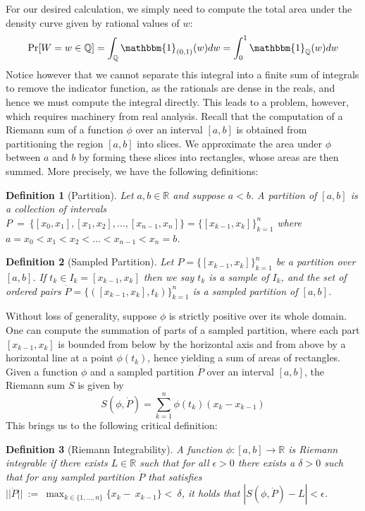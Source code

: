 \documentclass[10pt, oneside]{article}
\newcommand{\R}{\mathbb{R}}
\newcommand{\Q}{\mathbb{Q}}
\newtheorem{defn}{Definition}
\begin{document}
For our desired calculation, we simply need to compute the total area under the density curve given by rational values of $w$:
$$\Pr[W=w\in\Q]=\int_{\Q}\mathbbm{1}_{(0,1)}(w)dw=\int_{0}^{1}\mathbbm{1}_{\Q}(w)dw$$
Notice however that we cannot separate this integral into a finite sum of integrals to remove the indicator function, as the rationals are dense in the reals, and hence we must compute the integral directly.
This leads to a problem, however, which requires machinery from real analysis.
Recall that the computation of a Riemann sum of a function $\phi$ over an interval $[a,b]$ is obtained from partitioning the region $[a,b]$ into slices.
We approximate the area under $\phi$ between $a$ and $b$ by forming these slices into rectangles, whose areas are then summed.
More precisely, we have the following definitions:
\begin{defn}[Partition]
\label{defn:partition}
Let $a,b\in \R$ and suppose $a<b$. A partition of $[a,b]$ is a collection of intervals $P~=~\{[x_0,x_1],[x_1,x_2],\ldots,[x_{n-1},x_n]\}=\{[x_{k-1},x_{k}]\}_{k=1}^n$ where $a=x_0<x_1<x_2<\ldots<x_{n-1}<x_n=b$.
\end{defn}
\begin{defn}[Sampled Partition]
\label{defn:samplepartition}
Let $P=\{[x_{k-1},x_{k}]\}_{k=1}^n$ be a partition over $[a,b]$. If $t_k \in I_k=[x_{k-1},x_k]$ then we say $t_k$ is a sample of $I_k$, and the set of ordered pairs $\dot{P}=\{([x_{k-1},x_{k}],t_k)\}_{k=1}^n$ is a sampled partition of $[a,b]$.
\end{defn}
Without loss of generality, suppose $\phi$ is strictly positive over its whole domain.
One can compute the summation of parts of a sampled partition, where each part $[x_{k-1},x_k]$ is bounded from below by the horizontal axis and from above by a horizontal line at a point $\phi(t_k)$, hence yielding a sum of areas of rectangles.
Given a function $\phi$ and a sampled partition $\dot{P}$ over an interval $[a,b]$, the Riemann sum $S$ is given by 
$$S(\phi,\dot{P})=\sum_{k=1}^n\phi(t_k)(x_k-x_{k-1})$$
This brings us to the following critical definition:
\begin{defn}[Riemann Integrability]
\label{defn:riemann}
A function $\phi:[a,b]\to \R$ is Riemann integrable if there exists $L\in \R$ such that for all $\epsilon>0$ there exists a $\delta >0$ such that for any sampled partition $\dot{P}$ that satisfies $||\dot{P}||~:=~\max_{k\in\{1,\ldots,n\}}\{x_{k}-~x_{k-1}\}<~\delta$, it holds that $|S(\phi,\dot{P})-L|<\epsilon$.
\end{defn}
\end{document}

